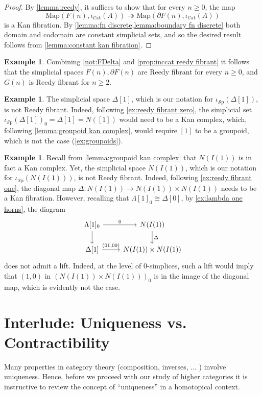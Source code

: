 \documentclass[11pt, a4paper]{amsart}
\newcommand{\Map}{\mathrm{Map}}
\newcommand{\Cat}{\mathscr{C}\mathrm{at}}
\newcommand{\inccat}{\iota_{\Cat}}
\newcommand{\incspace}{\iota_{\mathscr{S}\mathrm{p}}}
\theoremstyle{definition}
\newtheorem{example}[equation]{Example}
\theoremstyle{remark}
\numberwithin{equation}{section}
\begin{document}
\begin{proof}
  By \cref{lemma:reedy}, it suffices to show that for every $n \geq 0$, the map 
  \[\Map(F(n), \inccat(A)) \twoheadrightarrow \Map(\partial F(n), \inccat(A))\] 
  is a Kan fibration. By \cref{lemma:fn discrete,lemma:boundary fn discrete} both domain and codomain are constant simplicial sets, and so the desired result follows from \cref{lemma:constant kan fibration}.
\end{proof}

\begin{example}
  Combining \cref{not:FDelta} and \cref{prop:inccat reedy fibrant} it follows that the simplicial spaces $F(n), \partial F(n)$ are Reedy fibrant for every $n \geq 0$, and  $G(n)$ is Reedy fibrant for $n \geq 2$.
\end{example}

\begin{example} \label{ex:delta not reedy fibrant}
  The simplicial space $\Delta[1]$, which is our notation for $\incspace(\Delta[1])$, is not Reedy fibrant. Indeed, following \cref{ex:reedy fibrant zero}, the simplicial set $\incspace(\Delta[1])_0 = \Delta[1] = N([1])$ would need to be a Kan complex, which, following \cref{lemma:groupoid kan complex}, would require $[1]$ to be a groupoid, which is not the case (\cref{ex:groupoids}).
\end{example}

\begin{example} \label{ex:ione not reedy fibrant}
  Recall from \cref{lemma:groupoid kan complex} that $N(I(1))$ is in fact a Kan complex. Yet, the simplicial space $N(I(1))$, which is our notation for $\incspace(N(I(1)))$, is not Reedy fibrant. Indeed, following \cref{ex:reedy fibrant one}, the diagonal map $\Delta\colon N(I(1)) \to N(I(1)) \times N(I(1))$ needs to be a Kan fibration. However, recalling that $\Lambda[1]_0 \cong \Delta[0]$, by \cref{ex:lambda one horns}, the diagram
  \[
  \begin{tikzcd}
   \Lambda[1]_0 \arrow[r, "0"] \arrow[d] & N(I(1)) \arrow[d, "\Delta"] \\
   \Delta[1] \arrow[r, "{(01,00)}"] & N(I(1)) \times N(I(1))
  \end{tikzcd}
  \]
  does not admit a lift. Indeed, at the level of $0$-simplices, such a lift would imply that $(1,0)$ in $(N(I(1)) \times N(I(1)))_0$ is in the image of the diagonal map, which is evidently not the case.
\end{example}

\section{Interlude: Uniqueness vs. Contractibility} \label{sec:contractibility}
Many properties in category theory (composition, inverses, ... ) involve uniqueness. Hence, before we proceed with our study of higher categories it is instructive to review the concept of ``uniqueness'' in a homotopical context. 
\end{document}
